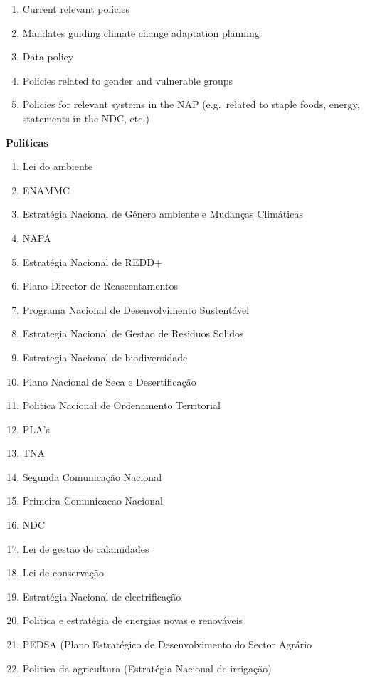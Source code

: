 \documentclass[
]{book}
\providecommand{\tightlist}{%
  \setlength{\itemsep}{0pt}\setlength{\parskip}{0pt}}
\begin{document}
\begin{enumerate}
\def\labelenumi{\alph{enumi}.}
\setcounter{enumi}{3}
\item
  Current relevant policies
\item
  Mandates guiding climate change adaptation planning
\item
  Data policy
\item
  Policies related to gender and vulnerable groups
\item
  Policies for relevant systems in the NAP (e.g.~related to staple foods, energy, statements in the NDC, etc.)
\end{enumerate}

\textbf{Politicas}

\begin{enumerate}
\def\labelenumi{\arabic{enumi}.}
\tightlist
\item
  Lei do ambiente
\item
  ENAMMC
\item
  Estratégia Nacional de Género ambiente e Mudanças Climáticas
\item
  NAPA
\item
  Estratégia Nacional de REDD+
\item
  Plano Director de Reascentamentos
\item
  Programa Nacional de Desenvolvimento Sustentável
\item
  Estrategia Nacional de Gestao de Residuos Solidos
\item
  Estrategia Nacional de biodiversidade
\item
  Plano Nacional de Seca e Desertificação
\item
  Politica Nacional de Ordenamento Territorial
\item
  PLA's
\item
  TNA
\item
  Segunda Comunicação Nacional
\item
  Primeira Comunicacao Nacional
\item
  NDC
\item
  Lei de gestão de calamidades
\item
  Lei de conservação
\item
  Estratégia Nacional de electrificação
\item
  Politica e estratégia de energias novas e renováveis
\item
  PEDSA (Plano Estratégico de Desenvolvimento do Sector Agrário
\item
  Politica da agricultura (Estratégia Nacional de irrigação)

\end{enumerate}
\end{document}
